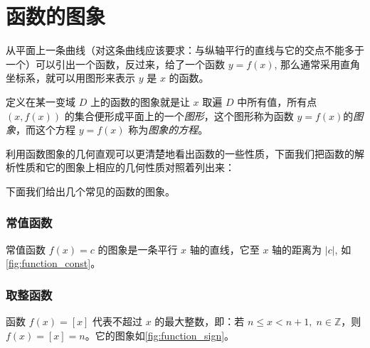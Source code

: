 \section{函数的图象}

从平面上一条曲线（对这条曲线应该要求：与纵轴平行的直线与它的交点不能多于一个）可以引出一个函数，反过来，给了一个函数 $y=f(x)$, 那么通常采用直角坐标系，就可以用图形来表示 $y$ 是 $x$ 的函数。

定义在某一变域 $D$ 上的函数的图象就是让 $x$ 取遍 $D$ 中所有值，所有点 $(x,f(x))$ 的集合便形成平面上的一个\emph{图形}，这个图形称为函数 $y=f(x)$的\emph{图象}，而这个方程 $y=f(x)$ 称为\emph{图象的方程}。

利用函数图象的几何直观可以更清楚地看出函数的一些性质，下面我们把函数的解析性质和它的图象上相应的几何性质对照着列出来：

\medskip{}

\medskip 下面我们给出几个常见的函数的图象。

\subsubsection{常值函数}
常值函数 $f(x)=c$ 的图象是一条平行 $x$ 轴的直线，它至 $x$ 轴的距离为 $|c|$, 如\cref{fig:function_const}。

\subsubsection{取整函数}
函数 $f(x)=[x]$ 代表不超过 $x$ 的最大整数，即：若 $n\leqslant x<n+1,\; n\in\mathbb{Z}$，则$f(x)=[x]=n$。它的图象如\cref{fig:function_sign}。

